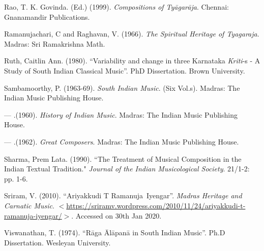 \begin{thebibliography}{99}
  Rao, T. K. Govinda. (Ed.) (1999). \textit{Compositions of Tyāgarāja}. Chennai: Gnanamandir Publications.

  Ramanujachari, C and Raghavan, V. (1966). \textit{The Spiritual Heritage of Tyagaraja}. Madras: Sri Ramakrishna Math.

  Ruth, Caitlin Ann. (1980). “Variability and change in three Karnataka \textit{Kriti}-s - A Study of South Indian Classical Music”. PhD Dissertation. Brown University.

  Sambamoorthy, P. (1963-69). \textit{South Indian Music}. (Six Vol.s). Madras: The Indian Music Publishing House.

  — .(1960). \textit{History of Indian Music}. Madras: The Indian Music Publishing House.

  — .(1962). \textit{Great Composers}. Madras: The Indian Music Publishing House.

  Sharma, Prem Lata. (1990). ``The Treatment of Musical Composition in the Indian Textual Tradition." \textit{Journal of the Indian Musicological Society}. 21/1-2: pp. 1-6.

  Sriram, V. (2010). “Ariyakkudi T Ramanuja Iyengar”. \textit{Madras Heritage and Carnatic Music}. $<$\url{https://sriramv.wordpress.com/2010/11/24/ariyakkudi-t-ramanuja-iyengar/}$>$. Accessed on 30th Jan 2020.

  Viswanathan, T. (1974). “Rāga Ālāpanā in South Indian Music”. Ph.D Dissertation. Wesleyan University.

 \end{thebibliography}

\label{endchapter4}
